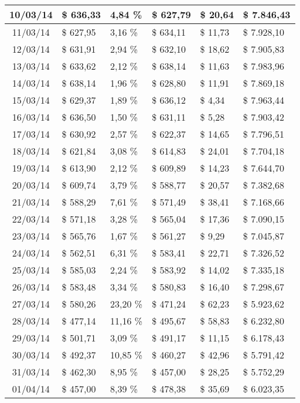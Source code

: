 \begin{small}
\begin{longtable}{|c|l|l|l|l|l|}
10/03/14 & \$ 636,33 & 4,84 \% & \$ 627,79 & \$ 20,64 & \$ 7.846,43 \\ \hline
11/03/14 & \$ 627,95 & 3,16 \% & \$ 634,11 & \$ 11,73 & \$ 7.928,10 \\ \hline
12/03/14 & \$ 631,91 & 2,94 \% & \$ 632,10 & \$ 18,62 & \$ 7.905,83 \\ \hline
13/03/14 & \$ 633,62 & 2,12 \% & \$ 638,14 & \$ 11,63 & \$ 7.983,96 \\ \hline
14/03/14 & \$ 638,14 & 1,96 \% & \$ 628,80 & \$ 11,91 & \$ 7.869,18 \\ \hline
15/03/14 & \$ 629,37 & 1,89 \% & \$ 636,12 & \$ 4,34 & \$ 7.963,44 \\ \hline
16/03/14 & \$ 636,50 & 1,50 \% & \$ 631,11 & \$ 5,28 & \$ 7.903,42 \\ \hline
17/03/14 & \$ 630,92 & 2,57 \% & \$ 622,37 & \$ 14,65 & \$ 7.796,51 \\ \hline
18/03/14 & \$ 621,84 & 3,08 \% & \$ 614,83 & \$ 24,01 & \$ 7.704,18 \\ \hline
19/03/14 & \$ 613,90 & 2,12 \% & \$ 609,89 & \$ 14,23 & \$ 7.644,70 \\ \hline
20/03/14 & \$ 609,74 & 3,79 \% & \$ 588,77 & \$ 20,57 & \$ 7.382,68 \\ \hline
21/03/14 & \$ 588,29 & 7,61 \% & \$ 571,49 & \$ 38,41 & \$ 7.168,66 \\ \hline
22/03/14 & \$ 571,18 & 3,28 \% & \$ 565,04 & \$ 17,36 & \$ 7.090,15 \\ \hline
23/03/14 & \$ 565,76 & 1,67 \% & \$ 561,27 & \$ 9,29 & \$ 7.045,87 \\ \hline
24/03/14 & \$ 562,51 & 6,31 \% & \$ 583,41 & \$ 22,71 & \$ 7.326,52 \\ \hline
25/03/14 & \$ 585,03 & 2,24 \% & \$ 583,92 & \$ 14,02 & \$ 7.335,18 \\ \hline
26/03/14 & \$ 583,48 & 3,34 \% & \$ 580,83 & \$ 16,40 & \$ 7.298,67 \\ \hline
27/03/14 & \$ 580,26 & 23,20 \% & \$ 471,24 & \$ 62,23 & \$ 5.923,62 \\ \hline
28/03/14 & \$ 477,14 & 11,16 \% & \$ 495,67 & \$ 58,83 & \$ 6.232,80 \\ \hline
29/03/14 & \$ 501,71 & 3,09 \% & \$ 491,17 & \$ 11,15 & \$ 6.178,43 \\ \hline
30/03/14 & \$ 492,37 & 10,85 \% & \$ 460,27 & \$ 42,96 & \$ 5.791,42 \\ \hline
31/03/14 & \$ 462,30 & 8,95 \% & \$ 457,00 & \$ 28,25 & \$ 5.752,29 \\ \hline
01/04/14 & \$ 457,00 & 8,39 \% & \$ 478,38 & \$ 35,69 & \$ 6.023,35 \\ \hline

\end{longtable}
\end{small}
